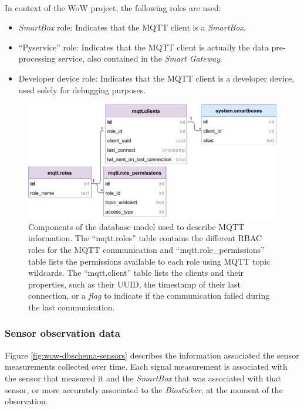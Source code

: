 \paragraph{} In context of the \acs{WoW} project, the following roles are used:

\begin{itemize}
    \item \textit{SmartBox} role: Indicates that the \acs{MQTT} client is a \textit{SmartBox}.
    \item ``Pyservice'' role: Indicates that the \acs{MQTT} client is actually the data pre-processing service, also contained in the \textit{Smart Gateway}.
    \item Developer device role: Indicates that the \acs{MQTT} client is a developer device, used solely for debugging purposes.
\end{itemize}

\begin{figure}[H]
    \centering
    \includegraphics[width=0.75\linewidth]{images/database-schema-mqtt.pdf}
    \caption[Components of the database model used to describe \acs{MQTT} information.]{
    Components of the database model used to describe \acs{MQTT} information. The ``mqtt.roles'' table contains the different \acs{RBAC} roles for the \acs{MQTT} communication and ``mqtt.role\_permissions'' table lists the permissions available to each role using \acs{MQTT} topic wildcards. The ``mqtt.client'' table lists the clients and their properties, such as their \acs{UUID}, the timestamp of their last connection, or a \textit{flag} to indicate if the communication failed during the last communication.}
    \label{fig:wow-dbschema-mqtt}
\end{figure}


\subsubsection{Sensor observation data}

Figure \ref{fig:wow-dbschema-sensors} describes the information associated the sensor measurements collected over time. Each signal measurement is associated with the sensor that measured it and the \textit{SmartBox} that was associated with that sensor, or more accurately associated to the \textit{Biosticker}, at the moment of the observation.


